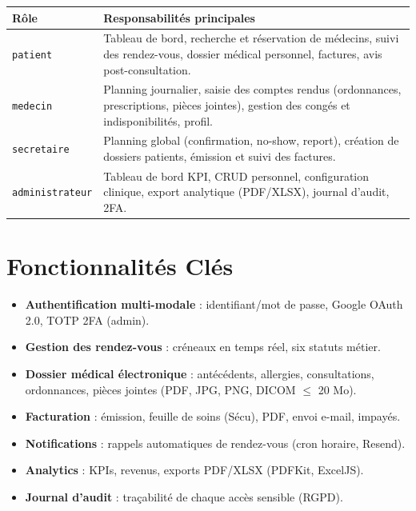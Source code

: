\documentclass[12pt,a4paper]{report}
\newcommand{\role}[1]{%
  \texttt{\small\colorbox{MedTealLight}{\textcolor{MedTealDark}{#1}}}}
\begin{document}
\begin{center}
\small
\begin{tabular}{@{} p{2.6cm} p{11.5cm} @{}}
  \toprule
  \textbf{Rôle} & \textbf{Responsabilités principales} \\
  \midrule
  \role{patient} &
    Tableau de bord, recherche et réservation de médecins, suivi des rendez-vous,
    dossier médical personnel, factures, avis post-consultation. \\[4pt]
  \role{medecin} &
    Planning journalier, saisie des comptes rendus (ordonnances, prescriptions,
    pièces jointes), gestion des congés et indisponibilités, profil. \\[4pt]
  \role{secretaire} &
    Planning global (confirmation, no-show, report), création de dossiers patients,
    émission et suivi des factures. \\[4pt]
  \role{administrateur} &
    Tableau de bord KPI, CRUD personnel, configuration clinique, export analytique
    (PDF/XLSX), journal d'audit, 2FA. \\
  \bottomrule
\end{tabular}
\end{center}

\section{Fonctionnalités Clés}

\begin{itemize}[leftmargin=*,itemsep=2pt]
  \item \textbf{Authentification multi-modale} : identifiant/mot de passe, Google OAuth 2.0, TOTP 2FA (admin).
  \item \textbf{Gestion des rendez-vous} : créneaux en temps réel, six statuts métier.
  \item \textbf{Dossier médical électronique} : antécédents, allergies, consultations, ordonnances, pièces jointes (PDF, JPG, PNG, DICOM $\leq$ 20 Mo).
  \item \textbf{Facturation} : émission, feuille de soins (Sécu), PDF, envoi e-mail, impayés.
  \item \textbf{Notifications} : rappels automatiques de rendez-vous (cron horaire, Resend).
  \item \textbf{Analytics} : KPIs, revenus, exports PDF/XLSX (PDFKit, ExcelJS).
  \item \textbf{Journal d'audit} : traçabilité de chaque accès sensible (RGPD).
\end{itemize}
\end{document}

